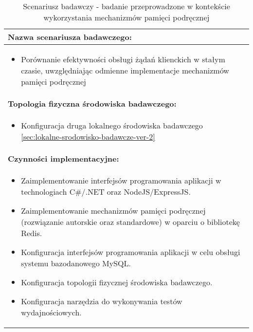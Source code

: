 \setlength{\LTcapwidth}{\textwidth}
\setlength\LTleft{0pt}
\setlength\LTright{0pt}
\begin{longtable}[c]{|llll|}
    \caption{Scenariusz badawczy - badanie przeprowadzone w kontekście wykorzystania mechanizmów pamięci podręcznej}
    \label{tab:research-scenario-5}                                                  \\ \hline
    \multicolumn{4}{|l|}{\textbf{Nazwa scenariusza badawczego:}}                     \\ \hline
    \multicolumn{4}{|p{\linewidth}|}{
        \begin{itemize}[label={}]
            \item Porównanie efektywności obsługi żądań klienckich w stałym czasie, uwzględniając odmienne implementacje mechanizmów pamięci podręcznej
          \end{itemize}
    } \\ \hline
    \multicolumn{4}{|l|}{\textbf{Topologia fizyczna środowiska badawczego:}}         \\ \hline
    \multicolumn{4}{|p{\linewidth}|}{
        \begin{itemize}[label={}]
            \item Konfiguracja druga lokalnego środowiska badawczego \ref{sec:lokalne-srodowisko-badawcze-ver-2}
          \end{itemize}
    }\\ \hline
    \multicolumn{4}{|l|}{\textbf{Czynności implementacyjne:}}                        \\ \hline
    \multicolumn{4}{|p{\linewidth}|}{
        \begin{itemize}
            \item Zaimplementowanie interfejsów programowania aplikacji w technologiach C\#/.NET oraz NodeJS/ExpressJS.
            \item Zaimplementowanie mechanizmów pamięci podręcznej (rozwiązanie autorskie oraz standardowe) w oparciu o bibliotekę Redis.
            \item Konfiguracja interfejsów programowania aplikacji w celu obsługi systemu bazodanowego MySQL.
            \item Konfiguracja topologii fizycznej środowiska badawczego.
            \item Konfiguracja narzędzia do wykonywania testów wydajnościowych.
        \end{itemize}}                                                           \\ \hline

\end{longtable}
